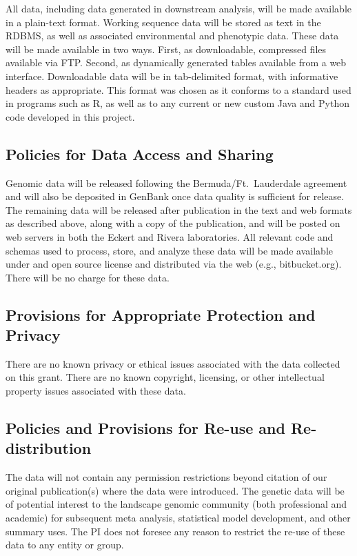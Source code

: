All data, including data generated in downstream analysis, will be made available in a plain-text format.  Working sequence
data will be stored as text in the RDBMS, as well as associated environmental and phenotypic data.  These data will be 
made available in two ways.  First, as downloadable, compressed files available via FTP.  Second, as dynamically generated
tables available from a web interface.  Downloadable data will be in tab-delimited format, with informative headers 
as appropriate.  This format was chosen as it conforms to a standard used in programs such as R, as well as to any 
current or new custom Java and Python code developed in this project.

\subsection*{Policies for Data Access and Sharing}
Genomic data will be released following the Bermuda/Ft.\ Lauderdale agreement and will also be deposited in 
GenBank once data quality is sufficient for release. The remaining data will be released after publication in the 
text and web formats as described above, along with a copy of the publication, and will be posted on web servers in both
the Eckert and Rivera laboratories. All relevant code and schemas used to process, store, and analyze these data will 
be made available under and open source license and distributed via the web (e.g., bitbucket.org).  There will be no 
charge for these data. 

\subsection*{Provisions for Appropriate Protection and Privacy}
There are no known privacy or ethical issues associated with the data collected on this grant. 
There are no known copyright, licensing, or other intellectual property issues associated with these data.

\subsection*{Policies and Provisions for Re-use and Re-distribution}
The data will not contain any permission restrictions beyond citation of our original publication(s) where the data 
were introduced. The genetic data will be of potential interest to the landscape genomic community (both 
professional and academic) for subsequent meta analysis, statistical model development, and other summary 
uses. The PI does not foresee any reason to restrict the re-use of these data to any entity or group.

